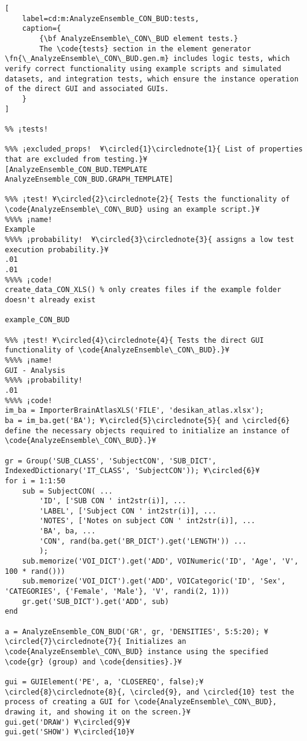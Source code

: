 \documentclass{tufte-handout}
\begin{document}
\begin{lstlisting}[
	label=cd:m:AnalyzeEnsemble_CON_BUD:tests,
	caption={
		{\bf AnalyzeEnsemble\_CON\_BUD element tests.}
		The \code{tests} section in the element generator \fn{\_AnalyzeEnsemble\_CON\_BUD.gen.m} includes logic tests, which verify correct functionality using example scripts and simulated datasets, and integration tests, which ensure the instance operation of the direct GUI and associated GUIs.
	}
]	

%% ¡tests!

%%% ¡excluded_props!  ¥\circled{1}\circlednote{1}{ List of properties that are excluded from testing.}¥
[AnalyzeEnsemble_CON_BUD.TEMPLATE AnalyzeEnsemble_CON_BUD.GRAPH_TEMPLATE]

%%% ¡test! ¥\circled{2}\circlednote{2}{ Tests the functionality of \code{AnalyzeEnsemble\_CON\_BUD} using an example script.}¥
%%%% ¡name!
Example
%%%% ¡probability!  ¥\circled{3}\circlednote{3}{ assigns a low test execution probability.}¥
.01
.01
%%%% ¡code!
create_data_CON_XLS() % only creates files if the example folder doesn't already exist

example_CON_BUD

%%% ¡test! ¥\circled{4}\circlednote{4}{ Tests the direct GUI functionality of \code{AnalyzeEnsemble\_CON\_BUD}.}¥
%%%% ¡name!
GUI - Analysis
%%%% ¡probability!
.01
%%%% ¡code!
im_ba = ImporterBrainAtlasXLS('FILE', 'desikan_atlas.xlsx');
ba = im_ba.get('BA'); ¥\circled{5}\circlednote{5}{ and \circled{6} define the necessary objects required to initialize an instance of \code{AnalyzeEnsemble\_CON\_BUD}.}¥

gr = Group('SUB_CLASS', 'SubjectCON', 'SUB_DICT', IndexedDictionary('IT_CLASS', 'SubjectCON')); ¥\circled{6}¥
for i = 1:1:50 
    sub = SubjectCON( ...
        'ID', ['SUB CON ' int2str(i)], ...
        'LABEL', ['Subject CON ' int2str(i)], ...
        'NOTES', ['Notes on subject CON ' int2str(i)], ...
        'BA', ba, ...
        'CON', rand(ba.get('BR_DICT').get('LENGTH')) ...
        );
    sub.memorize('VOI_DICT').get('ADD', VOINumeric('ID', 'Age', 'V', 100 * rand()))
    sub.memorize('VOI_DICT').get('ADD', VOICategoric('ID', 'Sex', 'CATEGORIES', {'Female', 'Male'}, 'V', randi(2, 1)))
    gr.get('SUB_DICT').get('ADD', sub)
end

a = AnalyzeEnsemble_CON_BUD('GR', gr, 'DENSITIES', 5:5:20); ¥\circled{7}\circlednote{7}{ Initializes an \code{AnalyzeEnsemble\_CON\_BUD} instance using the specified \code{gr} (group) and \code{densities}.}¥

gui = GUIElement('PE', a, 'CLOSEREQ', false);¥\circled{8}\circlednote{8}{, \circled{9}, and \circled{10} test the process of creating a GUI for \code{AnalyzeEnsemble\_CON\_BUD}, drawing it, and showing it on the screen.}¥
gui.get('DRAW') ¥\circled{9}¥
gui.get('SHOW') ¥\circled{10}¥


\end{lstlisting}
\end{document}
